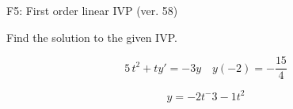 \begin{exercise}
  \begin{exerciseTitle}F5: First order linear IVP (ver. 58)\end{exerciseTitle}
  \begin{exerciseStatement}
    
Find the solution to the given IVP.

    
\[5 \, t^{2} +ty'= -3 y \hspace{1em} y( -2 ) = -\frac{15}{4}\]

  \end{exerciseStatement}
  \begin{exerciseAnswer}
    
\[y= -2 t^ -3 -1 t^{2}\]

  \end{exerciseAnswer}
\end{exercise}